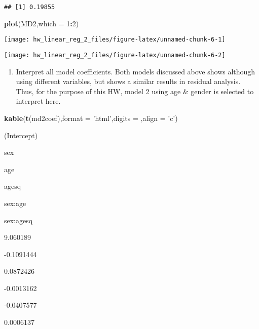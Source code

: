 \documentclass[]{article}
\newenvironment{Shaded}{\begin{snugshade}}{\end{snugshade}}
\newcommand{\DataTypeTok}[1]{\textcolor[rgb]{0.13,0.29,0.53}{#1}}
\newcommand{\DecValTok}[1]{\textcolor[rgb]{0.00,0.00,0.81}{#1}}
\newcommand{\KeywordTok}[1]{\textcolor[rgb]{0.13,0.29,0.53}{\textbf{#1}}}
\newcommand{\NormalTok}[1]{#1}
\newcommand{\OperatorTok}[1]{\textcolor[rgb]{0.81,0.36,0.00}{\textbf{#1}}}
\newcommand{\StringTok}[1]{\textcolor[rgb]{0.31,0.60,0.02}{#1}}
\providecommand{\tightlist}{%
  \setlength{\itemsep}{0pt}\setlength{\parskip}{0pt}}
\begin{document}
\begin{verbatim}
## [1] 0.19855
\end{verbatim}

\begin{Shaded}
\begin{Highlighting}[]
\KeywordTok{plot}\NormalTok{(MD2,}\DataTypeTok{which =} \DecValTok{1}\OperatorTok{:}\DecValTok{2}\NormalTok{)}
\end{Highlighting}
\end{Shaded}

\begin{center}\texttt{[image: hw\_linear\_reg\_2\_files/figure-latex/unnamed-chunk-6-1]} \end{center}

\begin{center}\texttt{[image: hw\_linear\_reg\_2\_files/figure-latex/unnamed-chunk-6-2]} \end{center}

\begin{enumerate}
\def\labelenumi{\arabic{enumi}.}
\setcounter{enumi}{3}
\tightlist
\item
  Interpret all model coefficients. Both models discussed above shows
  although using different variables, but shows a similar results in
  residual analysis. Thus, for the purpose of this HW, model 2 using age
  \& gender is selected to interpret here.\newline
\end{enumerate}

\begin{Shaded}
\begin{Highlighting}[]
\KeywordTok{kable}\NormalTok{(}\KeywordTok{t}\NormalTok{(md2coef),}\DataTypeTok{format =} \StringTok{'html'}\NormalTok{,}\DataTypeTok{digits =}\NormalTok{ ,}\DataTypeTok{align =} \StringTok{'c'}\NormalTok{)}
\end{Highlighting}
\end{Shaded}

(Intercept)

sex

age

agesq

sex:age

sex:agesq

9.060189

-0.1091444

0.0872426

-0.0013162

-0.0407577

0.0006137
\end{document}
